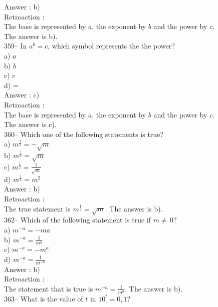 ﻿\documentclass[letterpaper, 12pt]{article}
\begin{document}
Answer : b)\\

Retroaction : \\
The base is represented by $a$, the exponent by $b$ and the power by $c$.\\
The answer is b).\\

359-- In $a^{b}=c$, which symbol represents the the power?\\
a) $a$\\
b) $b$\\
c) $c$\\
d) =\\

Answer : c)\\

Retroaction : \\
The base is represented by $a$, the exponent by $b$ and the power by $c$.\\
The answer is c).\\

360-- Which one of the following statements is true?\\
a) $m^{\frac{1}{2}}=-\sqrt{m}$\\
b) $m^{\frac{1}{2}}=\sqrt{m}$\\
c) $m^{\frac{1}{2}}=\frac{1}{\sqrt{m}}$\\
d) $m^{\frac{1}{2}}=m^{2}$\\

Answer : b)\\

Retroaction : \\
The true statement is $m^{\frac{1}{2}}=\sqrt{m}$.  The answer is b).\\


362-- Which of the following statement is true if $m\neq\,$0?\\
a) $m^{-a}=-ma$\\[2mm]
b) $m^{-a}=\frac{1}{m^{a}}$\\[2mm]
c) $m^{-a}=-m^{a}$\\[2mm]
d) $m^{-a}=\frac{1}{m^{-a}}$\\

Answer : b)\\

Retroaction : \\
The statement that is true is $m^{-a}=\frac{1}{m^{a}}$.  The answer is
b).\\

363-- What is the value of $t$ in $10^{t}=0,1$?\\
\end{document}
